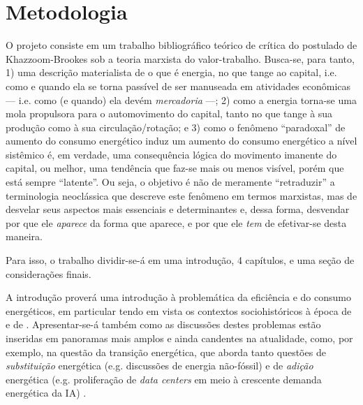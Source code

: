 \chapter{Metodologia}
\label{cap:metodologia}




O projeto consiste em um trabalho bibliográfico teórico de crítica do postulado de Khazzoom-Brookes sob a teoria marxista do valor-trabalho. Busca-se, para tanto, 1) uma descrição materialista de o que é energia, no que tange ao capital, i.e. como e quando ela se torna passível de ser manuseada em atividades econômicas --- i.e. como (e quando) ela devém \textit{mercadoria} ---; 2) como a energia torna-se uma mola propulsora para o automovimento do capital, tanto no que tange à sua produção como à sua circulação/rotação; e 3) como o fenômeno ``paradoxal'' de aumento do consumo energético induz um aumento do consumo energético a nível sistêmico é, em verdade, uma consequência lógica do movimento imanente do capital, ou melhor, uma tendência que faz-se mais ou menos visível, porém que está sempre ``latente''. Ou seja, o objetivo é não de meramente ``retraduzir'' a terminologia neoclássica que descreve este fenômeno em termos marxistas, mas de desvelar seus aspectos mais essenciais e determinantes e, dessa forma, desvendar por que ele \textit{aparece} da forma que aparece, e por que ele \textit{tem} de efetivar-se desta maneira.

Para isso, o trabalho dividir-se-á em uma introdução, 4 capítulos, e uma seção de considerações finais.

A introdução proverá uma introdução à problemática da eficiência e do consumo energéticos, em particular tendo em vista os contextos sociohistóricos à época de \textcite{Jevons1866} e de \textcite{Brookes1990,Saunders1992}. Apresentar-se-á também como as discussões destes problemas estão inseridas em panoramas mais amplos e ainda candentes na atualidade, como, por exemplo, na questão da transição energética, que aborda tanto questões de \textit{substituição} energética (e.g. discussões de energia não-fóssil) e de \textit{adição} energética (e.g. proliferação de \textit{data centers} em meio à crescente demanda energética da IA) \parencite{Malm2016,Monserrate2022}. 

